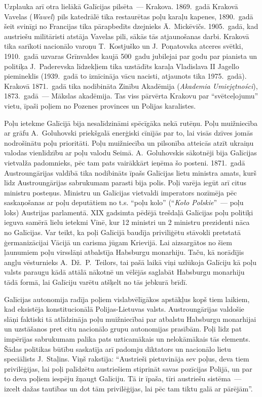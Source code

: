 \documentclass[twoside,a5paper,12pt,fleqn,openany]{extbook}
\newcommand{\pltxti}[1]{\textit{\textpolish{#1}}}
\begin{document}
Uzplauka arī otra lielākā Galīcijas pilsēta~--- Krakova. 1869.~gadā Krakovā Vavelas (\pltxti{Wawel}) pils katedrālē tika restaurētas poļu karaļu kapenes, 1890.~gadā šeit svinīgi no Francijas tika pārapbedīts dzejnieks Ā.~Mickēvičs. 1905.~gadā, kad austriešu militāristi atstāja Vavelas pili, sākās tās atjaunošanas darbi. Krakovā tika sarīkoti nacionālo varoņu T.~Kostjuško un J.~Poņatovska atceres svētki, 1910.~gadā uzvaras Grīnvaldes kaujā 500~gadu jubilejai par godu par pianista un politiķa J.~Paderevska līdzekļiem tika uzstādīts karaļa Vladislava II Jagello piemineklis (1939.~gadā to iznīcināja vācu nacisti, atjaunots tika 1975.~gadā). Krakovā 1871.~gadā tika nodibināta Zinību Akadēmija (\pltxti{Akademia Umiejętności}), 1873.~gadā~--- Mākslas akadēmija. Tas viss pārvērta Krakovu par ``svētceļojumu'' vietu, īpaši poļiem no Pozenes provinces un Polijas karalistes.

Poļu ietekme Galīcijā bija nesalīdzināmi spēcīgāka nekā rutēņu. Poļu muižniecība ar grāfu A.~Goluhovski priekšgalā enerģiski cīnījās par to, lai visās dzīves jomās nodrošinātu poļu prioritāti. Poļu muižniecība un pilsonība atteicās atzīt ukraiņu valodas vienlīdzību ar poļu valodu Seimā. A.~Goluhovskis sākotnēji bija Galīcijas vietvalža padomnieks, pēc tam pats vairākkārt ieņēma šo posteni. 1871.~gadā Austroungārijas valdībā tika nodibināts īpašs Galīcijas lietu ministra amats, kurš līdz Austroungārijas sabrukumam parasti bija polis. Poļi varēja iegūt arī citus ministru posteņus. Ministru un Galīcijas vietvaldi imperators nozīmēja pēc saskaņošanas ar poļu deputātiem no t.s. ``poļu kolo'' (``\pltxti{Koło Polskie}''~--- poļu loks) Austrijas parlamentā. XIX gadsimta pēdējā trešdaļā Galīcijas poļu politiķi ieguva samērā lielu ietekmi Vīnē, kur 12 ministri un 2 ministru prezidenti nāca no Galīcijas. Var teikt, ka poļi Galīcijā baudīja priviliģētu stāvokli pretstatā ģermanizācijai Vācijā un carisma jūgam Krievijā. Lai aizsargātos no šiem ļaunumiem poļu virsslāņi atbalstīja Habsburgu monarhiju. Taču, kā norādījis angļu vēsturnieks A.~Dž.~P.~Teilors, tai pašā laikā viņi uzlūkoja Galīciju kā poļu valsts paraugu kādā attālā nākotnē un vēlējās saglabāt Habsburgu monarhiju tādā formā, lai Galīciju varētu atšķelt no tās jebkurā brīdī.

Galīcijas autonomija radīja poļiem vislabvēlīgākos apstākļus kopš tiem laikiem, kad eksistēja konstitucionālā Polijas-Lietuvas valsts. Austroungārijas valdošie slāņi faktiski tā atlīdzināja poļu muižniecībai par atbalstu Habsburgu monarhijai un uzstāšanos pret citu nacionālo grupu autonomijas prasībām. Poļi līdz pat impērijas sabrukumam palika pats uzticamākais un nelokāmākais tās elements. Šādas politikas būtību saskatīja arī padomju diktators un nacionālo lietu speciālists J.~Staļins. Viņš rakstīja: ``Austrieši pietuvināja sev poļus, deva tiem privilēģijas, lai poļi palīdzētu austriešiem stiprināt savas pozīcijas Polijā, un par to deva poļiem iespēju žņaugt Galīciju. Tā ir īpaša, tīri austriešu sistēma~--- izcelt dažas tautības un dot tām privilēģijas, lai pēc tam tiktu galā ar pārējām''.
\end{document}
